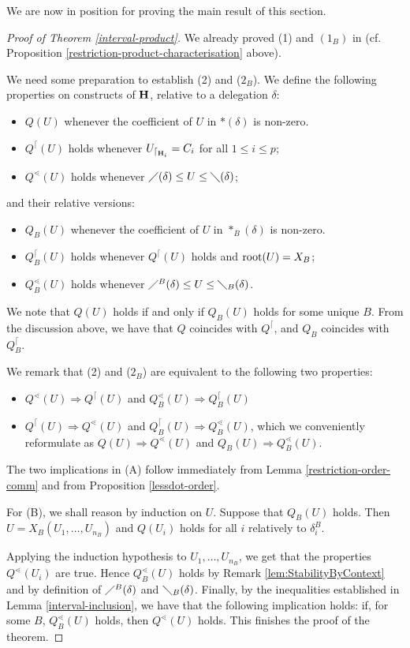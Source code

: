 \documentclass{article}
\theoremstyle{plain}
\theoremstyle{definition}
\newcommand{\hyper}[1]{{\bf #1}}
\newcommand{\restrconstr}[2]{{#1}_{\lceil_{#2}}}
\begin{document}
We are now in position for proving the main result of this section.

\begin{proof}[Proof of Theorem \ref{interval-product}]
We already proved (1) and $(1_B)$ in \cite{PLBJ1} (cf. Proposition \ref{restriction-product-characterisation} above). 

\medskip
We need some preparation to establish (2) and ($2_B$).
We define the following properties on constructs of $\hyper{H}$, relative to a delegation $\delta$:
\begin{itemize}
\item $Q(U)$ whenever the coefficient of $U$ in $\ast(\delta)$ is non-zero.
\item $Q^\lceil(U)$ holds whenever $\restrconstr{U}{\hyper{H}_i}= C_i$ for all $1\leq i\leq p$;
\item $Q^\lessdot(U)$ holds whenever $\diagup(\delta) \leq U \leq\diagdown(\delta)$;

\end{itemize}
and their relative versions:
\begin{itemize}
\item $Q_B(U)$ whenever the coefficient of $U$ in $\ast_B(\delta)$ is non-zero.
\item $Q_B^\lceil(U)$ holds whenever $Q^\lceil(U)$ holds and ${\rm root}(U)=X_B$;
\item $Q_B^\lessdot(U)$ holds whenever $\diagup^B(\delta) \leq U \leq\diagdown_B(\delta)$.
\end{itemize}
We note that $Q(U)$ holds if and only if $Q_B(U)$ holds for some unique $B$.
From the discussion above, we have that $Q$ coincides with $Q^{\lceil}$, and $Q_B$ coincides with $Q_B^\lceil$.

We remark that (2) and ($2_B$) are equivalent to the following two properties: 
\begin{itemize}
\item[(A)] $Q^{\lessdot}(U) \Rightarrow Q^\lceil(U)$ and $Q_B^{\lessdot}(U) \Rightarrow Q_B^\lceil(U)$
\item[(B)] $Q^{\lceil}(U) \Rightarrow Q^\lessdot(U)$ and $Q_B^{\lceil}(U) \Rightarrow Q_B^\lessdot(U)$, which we conveniently reformulate as $Q(U) \Rightarrow Q^\lessdot(U)$ and $Q_B(U)\Rightarrow Q_B^\lessdot(U)$.
\end{itemize}
The two implications in (A) follow immediately 
 from Lemma \ref{restriction-order-comm} and from Proposition \ref{lessdot-order}.


For (B), we shall reason by induction on $U$. Suppose that 
$Q_B(U)$ holds. Then $U=X_B(U_1,\ldots,U_{n_B})$ and $Q(U_i)$ holds for all $i$ relatively to $\delta_i^B$.

Applying the induction hypothesis to $U_1, \ldots, U_{n_B}$, we get that the properties $Q^\lessdot(U_i)$ are true. Hence $Q^\lessdot_{B}(U)$ holds by Remark \ref{lem:StabilityByContext} and by definition of $\diagup^B(\delta)$ and $\diagdown_B(\delta)$. Finally, by the inequalities 
established in Lemma \ref{interval-inclusion}, we have that the following implication holds: if, for some $B$, $Q^\lessdot_B(U)$ holds, then $Q^\lessdot(U)$ holds. This finishes the proof of the theorem. 
\end{proof}
\end{document}

